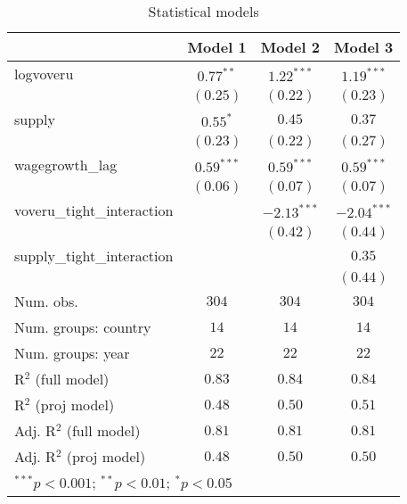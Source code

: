 
\begin{table}
\begin{center}
\begin{tabular}{l c c c}
\hline
 & Model 1 & Model 2 & Model 3 \\
\hline
logvoveru                  & $0.77^{**}$  & $1.22^{***}$  & $1.19^{***}$  \\
                           & $(0.25)$     & $(0.22)$      & $(0.23)$      \\
supply                     & $0.55^{*}$   & $0.45$        & $0.37$        \\
                           & $(0.23)$     & $(0.22)$      & $(0.27)$      \\
wagegrowth\_lag            & $0.59^{***}$ & $0.59^{***}$  & $0.59^{***}$  \\
                           & $(0.06)$     & $(0.07)$      & $(0.07)$      \\
voveru\_tight\_interaction &              & $-2.13^{***}$ & $-2.04^{***}$ \\
                           &              & $(0.42)$      & $(0.44)$      \\
supply\_tight\_interaction &              &               & $0.35$        \\
                           &              &               & $(0.44)$      \\
\hline
Num. obs.                  & $304$        & $304$         & $304$         \\
Num. groups: country       & $14$         & $14$          & $14$          \\
Num. groups: year          & $22$         & $22$          & $22$          \\
R$^2$ (full model)         & $0.83$       & $0.84$        & $0.84$        \\
R$^2$ (proj model)         & $0.48$       & $0.50$        & $0.51$        \\
Adj. R$^2$ (full model)    & $0.81$       & $0.81$        & $0.81$        \\
Adj. R$^2$ (proj model)    & $0.48$       & $0.50$        & $0.50$        \\
\hline
\multicolumn{4}{l}{\scriptsize{$^{***}p<0.001$; $^{**}p<0.01$; $^{*}p<0.05$}}
\end{tabular}
\caption{Statistical models}
\label{table:coefficients}
\end{center}
\end{table}
